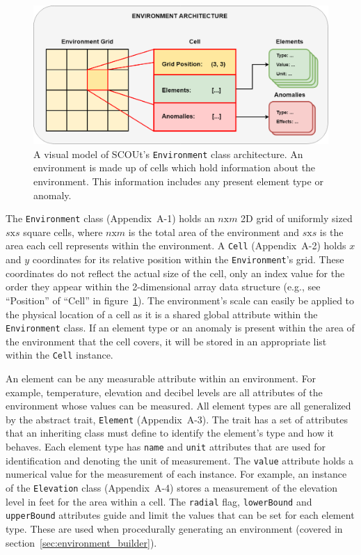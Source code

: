 \begin{figure}[H]
  \centering
  \includegraphics[width=1.0\columnwidth]{Figures/environment_model.png}
  \caption[Environment Data Architecture]{A visual model of SCOUt's \texttt{Environment} class architecture. An environment is made up of cells which hold information about the environment. This information includes any present element type or anomaly.}
  \label{fig:environment_model}
\end{figure}

The \texttt{Environment} class (Appendix~A-1) holds an $n \text{x} m$ 2D grid of uniformly sized $s \text{x} s$ square cells, where $n \text{x} m$ is the total area of the environment and $s \text{x} s$ is the area each cell represents within the environment.
A \texttt{Cell} (Appendix~A-2) holds $x$ and $y$ coordinates for its relative position within the \texttt{Environment}'s grid.
These coordinates do not reflect the actual size of the cell, only an index value for the order they appear within the 2-dimensional array data structure (e.g., see ``Position'' of ``Cell'' in figure~\ref{fig:environment_model}).
The environment's scale can easily be applied to the physical location of a cell as it is a shared global attribute within the \texttt{Environment} class.
If an element type or an anomaly is present within the area of the environment that the cell covers, it will be stored in an appropriate list within the \texttt{Cell} instance.

An element can be any measurable attribute within an environment.
For example, temperature, elevation and decibel levels are all attributes of the environment whose values can be measured.
All element types are all generalized by the abstract trait, \texttt{Element} (Appendix~A-3).
The trait has a set of attributes that an inheriting class must define to identify the element's type and how it behaves.
Each element type has \texttt{name} and \texttt{unit} attributes that are used for identification and denoting the unit of measurement.
The \texttt{value} attribute holds a numerical value for the measurement of each instance.
For example, an instance of the \texttt{Elevation} class (Appendix~A-4) stores a measurement of the elevation level in feet for the area within a cell.
The \texttt{radial} flag, \texttt{lowerBound} and \texttt{upperBound} attributes guide and limit the values that can be set for each element type.
These are used when procedurally generating an environment (covered in section~\ref{sec:environment_builder}).

